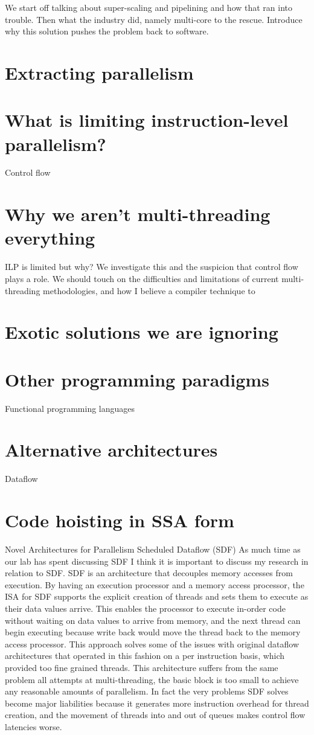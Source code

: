 \documentclass[12pt,twoside,letterpaper]{article}
\begin{document}
We start off talking about super-scaling and pipelining and how that ran into trouble. Then what the industry did, namely multi-core to the rescue. Introduce why this solution pushes the problem back to software.


\section*{Extracting parallelism}
\section*{What is limiting instruction-level parallelism?}
Control flow
\section*{Why we aren't multi-threading everything}

ILP is limited but why? We investigate this and the suspicion that control flow plays a role. We should touch on the difficulties and limitations of current multi-threading methodologies, and how I believe a compiler technique to 


\section*{Exotic solutions we are ignoring}
\section*{Other programming paradigms}
Functional programming languages
\section*{Alternative architectures}
Dataflow

\section*{Code hoisting in SSA form}

Novel Architectures for Parallelism
Scheduled Dataflow (SDF)
As much time as our lab has spent discussing SDF I think it is important to discuss my research in relation to SDF. SDF is an architecture that decouples memory accesses from execution. By having an execution processor and a memory access processor, the ISA for SDF supports the explicit creation of threads and sets them to execute as their data values arrive. This enables the processor to execute in-order code without waiting on data values to arrive from memory, and the next thread can begin executing because write back would move the thread back to the memory access processor. This approach solves some of the issues with original dataflow architectures that operated in this fashion on a per instruction basis, which provided too fine grained threads. This architecture suffers from the same problem all attempts at multi-threading, the basic block is too small to achieve any reasonable amounts of parallelism. In fact the very problems SDF solves become major liabilities because it generates more instruction overhead for thread creation, and the movement of threads into and out of queues makes control flow latencies worse.
\end{document}
